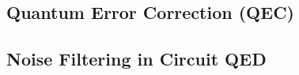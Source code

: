 \subsection{Quantum Error Correction (QEC)}


\subsection{Noise Filtering in Circuit QED}










